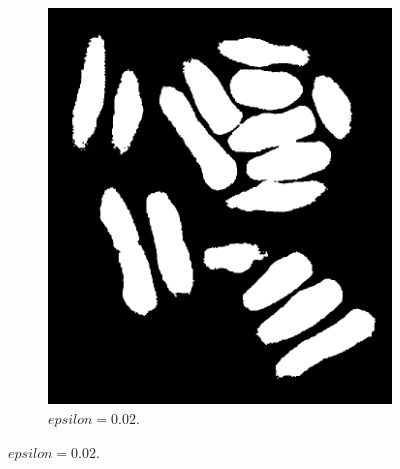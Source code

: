 \documentclass[a4paper]{article}
\begin{document}
\begin{figure}[h]
\begin{subfigure}[b]{0.25\textwidth}
                \includegraphics[width=\textwidth]{q3-yeast-002.png}
                \caption{$epsilon=0.02$. }
                \label{fig:6b}
                

\end{subfigure}
\end{figure}
\end{document}
